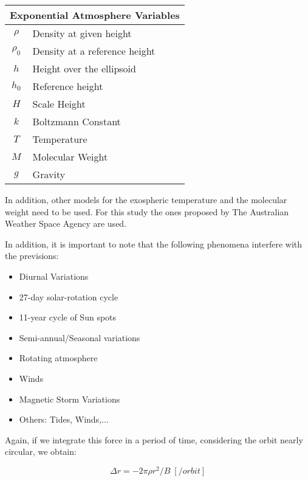 \begin{table}[H]
\centering
\begin{tabular}{|c|l|}
\hline
\multicolumn{2}{|c|}{Exponential Atmosphere Variables}     \\ \hline
$\rho$             & Density at given height                  \\ \hline
$\rho_{0}$         & Density at a reference height		       \\ \hline
$h$           & Height over the ellipsoid            \\ \hline
$h_{0}$            & Reference height \\ \hline
$H$              & Scale Height      \\ \hline
$k$              & Boltzmann Constant      \\ \hline
$T$              & Temperature      \\ \hline
$M$              & Molecular Weight      \\ \hline
$g$              & Gravity      \\ \hline

\end{tabular}
\end{table}  

In addition, other models for the exospheric temperature and the molecular weight need to be used. For this study the ones proposed by The Australian Weather Space Agency are used.

In addition, it is important to note that the following phenomena interfere with the previsions:

\begin{itemize}
\item Diurnal Variations
\item 27-day solar-rotation cycle
\item 11-year cycle of Sun spots
\item Semi-annual/Seasonal variations
\item Rotating atmosphere
\item Winds
\item Magnetic Storm Variations
\item Others: Tides, Winds,...
\end{itemize}

Again, if we integrate this force in a period of time, considering the orbit nearly circular, we obtain:

\begin{equation}
\Delta r = -2 \pi \rho r^2/B \; [/orbit]
\end{equation}

